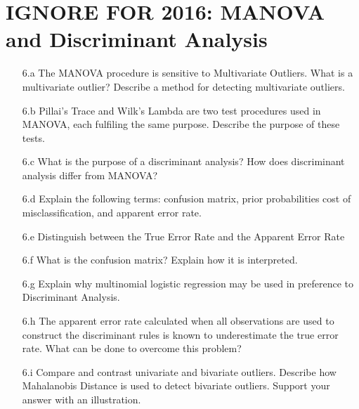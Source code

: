 \documentclass[a4paper,12pt]{article}
\begin{document}
\section*{IGNORE FOR 2016: MANOVA and Discriminant Analysis}
\begin{itemize}
\item[6.a] The MANOVA procedure is sensitive to Multivariate Outliers. What is a multivariate outlier? Describe a method for detecting multivariate outliers.

\item[6.b] Pillai's Trace and Wilk's Lambda are two test procedures used in MANOVA, each fulfiling the same purpose.
Describe the purpose of these tests.

\item[6.c] What is the purpose of a discriminant analysis? How does discriminant analysis differ from MANOVA?

\item[6.d] Explain the following terms: confusion matrix, prior probabilities cost of misclassification, and apparent error rate.

\item[6.e] Distinguish between the True Error Rate and the Apparent Error Rate

\item[6.f]  What is the confusion matrix? Explain how it is interpreted.

\item[6.g] Explain why multinomial logistic regression may be used in preference to Discriminant Analysis.

\item[6.h] The apparent error rate calculated when all observations are used to construct
the discriminant rules is known to underestimate the true error rate. What can be done
to overcome this problem?

\item[6.i] Compare and contrast univariate and bivariate outliers. Describe how Mahalanobis Distance is used to detect bivariate outliers. Support your answer with an illustration.

\end{itemize}
\end{document}
